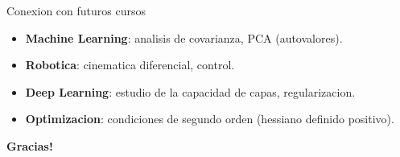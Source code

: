 \documentclass[aspectratio=169, 10pt, xcolor=table]{beamer}
\begin{document}
\begin{frame}{Conexion con futuros cursos}
    \begin{itemize}
        \item \textbf{Machine Learning}: analisis de covarianza, PCA (autovalores).
        \item \textbf{Robotica}: cinematica diferencial, control.
        \item \textbf{Deep Learning}: estudio de la capacidad de capas, regularizacion.
        \item \textbf{Optimizacion}: condiciones de segundo orden (hessiano definido positivo).
    \end{itemize}
\end{frame}

\begin{frame}
    \centering
    \Huge \textbf{Gracias!}

\end{frame}
\end{document}
